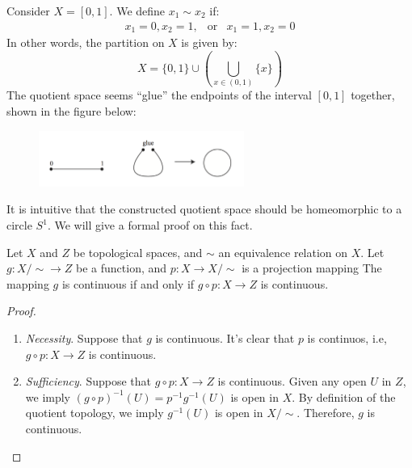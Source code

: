 \begin{example}\label{exp:6:5}
Consider $X=[0,1]$. We define $x_1\sim x_2$ if:
\[
\begin{array}{lll}
x_1=0,x_2=1,
&
\text{or}
&
x_1=1,x_2=0
\end{array}
\]
In other words, the partition on $X$ is given by:
\[
X = \{0,1\}\cup(\bigcup_{x\in(0,1)}\{x\})
\]
The quotient space seems ``glue'' the endpoints of the interval $[0,1]$ together, shown in the figure below:
\begin{figure}[H]
\centering\includegraphics[width=0.6\textwidth]{week6/Fig_4}
\end{figure}
It is intuitive that the constructed quotient space should be homeomorphic to a circle $S^1$. We will give a formal proof on this fact.
\end{example}
\begin{proposition}\label{pro:6:3}
Let $X$ and $Z$ be topological spaces, and $\sim$ an equivalence relation on $X$.
Let $g:X/\sim\to Z$ be a function, and $p:X\to X/\sim$ is a projection mapping
The mapping $g$ is continuous if and only if $g\circ p:X\to Z$ is continuous.
\end{proposition}
\begin{proof}
\begin{enumerate}
\item
\textit{Necessity}.
Suppose that $g$ is continuous. It's clear that $p$ is continuos, i.e, $g\circ p:X\to Z$ is continuous.
\item
\textit{Sufficiency}.
Suppose that $g\circ p:X\to Z$ is continuous.
Given any open $U$ in $Z$, we imply $(g\circ p)^{-1}(U) = p^{-1}g^{-1}(U)$ is open in $X$.
By definition of the quotient topology, we imply $g^{-1}(U)$ is open in $X/\sim$.
Therefore, $g$ is continuous.
\end{enumerate}
\end{proof}
